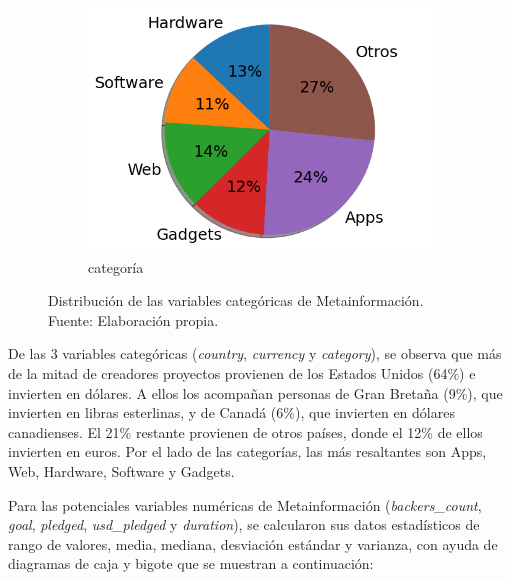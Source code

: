 \begin{figure}[!ht]
\begin{subfigure}{.35\textwidth}
		\includegraphics[width=1.15\linewidth]{4/figures/category_distribution.png}
		\caption{categoría}
	\end{subfigure}
	\caption[Distribución de las variables categóricas de Metainformación]{Distribución de las variables categóricas de Metainformación.\\
		Fuente: Elaboración propia.}
	\label{4:fig11}
\end{figure}

De las 3 variables categóricas (\textit{country}, \textit{currency} y \textit{category}), se observa que más de la mitad de creadores proyectos provienen de los Estados Unidos (64\%) e invierten en dólares. A ellos los acompañan personas de Gran Bretaña (9\%), que invierten en libras esterlinas, y de Canadá (6\%), que invierten en dólares canadienses. El 21\% restante provienen de otros países, donde el 12\% de ellos invierten en euros. Por el lado de las categorías, las más resaltantes son Apps, Web, Hardware, Software y Gadgets.

Para las potenciales variables numéricas de Metainformación (\textit{backers\_count}, \textit{goal}, \textit{pledged}, \textit{usd\_pledged} y \textit{duration}), se calcularon sus datos estadísticos de rango de valores, media, mediana, desviación estándar y varianza, con ayuda de diagramas de caja y bigote que se muestran a continuación:


